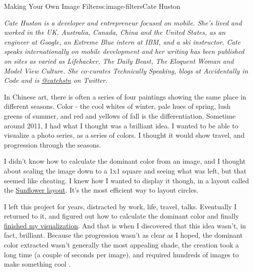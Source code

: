 \begin{aosachapter}{Making Your Own Image Filters}{s:image-filters}{Cate Huston}

\emph{Cate Huston is a developer and entrepreneur focused on mobile.
She's lived and worked in the UK, Australia, Canada, China and the
United States, as an engineer at Google, an Extreme Blue intern at IBM,
and a ski instructor. Cate speaks internationally on mobile development
and her writing has been published on sites as varied as Lifehacker, The
Daily Beast, The Eloquent Woman and Model View Culture. She co-curates
Technically Speaking, blogs at Accidentally in Code and is
\href{https://twitter.com/catehstn}{@catehstn} on Twitter.}

\label{a-story-of-a-brilliant-idea-that-wasnt-all-that-brilliant}

In Chinese art, there is often a series of four paintings showing the
same place in different seasons. Color - the cool whites of winter, pale
hues of spring, lush greens of summer, and red and yellows of fall is
the differentiation. Sometime around 2011, I had what I thought was a
brilliant idea. I wanted to be able to visualize a photo series, as a
series of colors. I thought it would show travel, and progression
through the seasons.

I didn't know how to calculate the dominant color from an image, and I
thought about scaling the image down to a 1x1 square and seeing what was
left, but that seemed like cheating. I knew how I wanted to display it
though, in a layout called the
\href{http://www.catehuston.com/applets/Sunflower/index.html}{Sunflower
layout}. It's the most efficient way to layout circles.

I left this project for years, distracted by work, life, travel, talks.
Eventually I returned to it, and figured out how to calculate the
dominant color and finally
\href{http://www.catehuston.com/blog/2013/09/02/visualising-a-photo-series/}{finished
my visualization}. And that is when I discovered that this idea wasn't,
in fact, brilliant. Because the progression wasn't as clear as I hoped,
the dominant color extracted wasn't generally the most appealing shade,
the creation took a long time (a couple of seconds per image), and
required hundreds of images to make something cool
.



\end{aosachapter}
